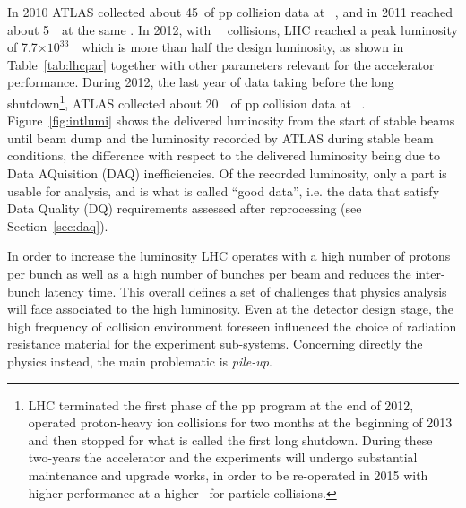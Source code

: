 In 2010 ATLAS collected about 45~\ipb of pp collision data at ~\tev, and in
2011 reached about 5~\ifb\ at the same \cme.
In 2012, with  ~\tev\ collisions, LHC reached a peak luminosity of 7.7$\times10^{33}$~\ which is
more than half the design luminosity, as shown in Table~\ref{tab:lhcpar} together
with other parameters relevant for the accelerator performance. 
During 2012, the last
year of data taking before the long shutdown\footnote{LHC terminated the first phase of the pp program
at the end of 2012, operated proton-heavy ion collisions for two months at the beginning
of 2013 and then stopped for what is called the first long shutdown. During these two-years
the accelerator and the experiments will undergo substantial maintenance and 
upgrade works, in order to be re-operated in 2015 with higher performance at a higher
\cme\ for particle collisions.},
ATLAS collected about 20~\ifb\ of pp collision data at ~\tev.
Figure~\ref{fig:intlumi} shows the delivered luminosity from the start of stable beams until beam dump and the luminosity recorded by
ATLAS during stable beam conditions, the difference with respect to the delivered luminosity being due to Data AQuisition (DAQ)
inefficiencies. Of the recorded luminosity, only a part is usable for analysis, and is what is called ``good data'', i.e. 
the data that satisfy Data Quality (DQ) requirements assessed after reprocessing (see Section~\ref{sec:daq}).

In order to increase the luminosity LHC operates with a high number of protons per bunch as well as a high
 number of bunches per beam and reduces the inter-bunch latency time.
This overall defines a set of challenges that physics analysis will face associated to the high luminosity.
Even at the detector design stage, the high frequency of collision environment foreseen influenced
the choice of radiation resistance material for the experiment sub-systems. Concerning directly the physics
instead, the main problematic is \textit{pile-up}.

